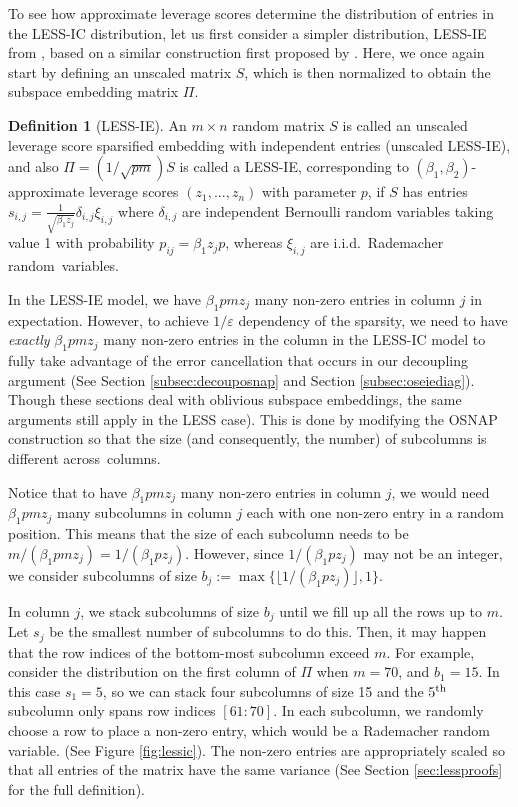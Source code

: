 \documentclass[11pt]{amsart}
\numberwithin{equation}{section}
\numberwithin{equation}{section}
\theoremstyle{remark}
\theoremstyle{definition}
\newtheorem{definition}[theorem]{Definition}
\begin{document}
To see how approximate leverage scores determine the distribution of entries in the LESS-IC distribution, let us first consider a simpler distribution, LESS-IE from \cite{chenakkod2024optimal}, based on a similar construction first proposed by \cite{less-embeddings}. Here, we once again start by defining an unscaled matrix $S$, which is then normalized to obtain the subspace embedding matrix $\Pi$.

\begin{definition}[LESS-IE]\label{def:lessindent}
An $m \times n$ random matrix $S$ is called an unscaled leverage score sparsified embedding with independent entries (unscaled LESS-IE), and also $\Pi = (1/\sqrt{pm})S$ is called a LESS-IE, corresponding to $(\beta_1, \beta_2)$-approximate leverage scores $(z_1,...,z_n)$ with parameter $p$, if $S$ has entries $s_{i,j}=\frac{1}{\sqrt{\beta_1  z_j}} \delta_{i,j} \xi_{i,j}$ where $\delta_{i,j}$ are independent Bernoulli random variables taking value 1 with probability $p_{ij}= \beta_1 z_j p$, whereas $\xi_{i,j}$ are i.i.d.~Rademacher random~variables. 
\end{definition}

In the LESS-IE model, we have $\beta_1 pm z_j $ many non-zero entries in  column $j$ in expectation. However, to achieve $1/\varepsilon$ dependency of the sparsity, we need to have \emph{exactly} $\beta_1 pm z_j $ many non-zero entries in the column in the LESS-IC model to fully take advantage of the error cancellation that occurs in our decoupling argument (See Section \ref{subsec:decouposnap} and Section \ref{subsec:oseiediag}). Though these sections deal with oblivious subspace embeddings, the same arguments still apply in the LESS case). This is done by modifying the OSNAP construction so that the size (and consequently, the number) of subcolumns is different across~columns.

Notice that to have $\beta_1 pm z_j$ many non-zero entries in column $j$, we would need $\beta_1 pm z_j$ many subcolumns in column $j$ each with one non-zero entry in a random position. This means that the size of each subcolumn needs to be $m/(\beta_1 pm z_j) = 1/(\beta_1pz_j)$. However, since $1/(\beta_1pz_j)$ may not be an integer, we consider subcolumns of size $ b_j := \max \{ \lfloor 1/(\beta_1pz_j)\rfloor, 1 \}$. 

In column $j$, we stack subcolumns of size $b_j$ until we fill up all the rows up to $m$. Let $s_j$ be the smallest number of subcolumns to do this. Then, it may happen that the row indices of the bottom-most subcolumn exceed $m$. For example, consider the distribution on the first column of $\Pi$ when $m=70$, and $b_1 = 15$. In this case $s_1 = 5$, so we can stack four subcolumns of size 15 and the $5\textsuperscript{th}$ subcolumn only spans row indices $[61:70]$. In each subcolumn, we randomly choose a row to place a non-zero entry, which would be a Rademacher random variable. (See Figure \ref{fig:lessic}). The non-zero entries are appropriately scaled so that all entries of the matrix have the same variance (See Section \ref{sec:lessproofs} for the full definition).
\end{document}
